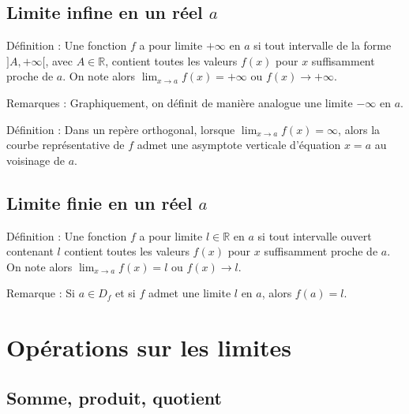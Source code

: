 \documentclass[11pt,a4paper]{article}
\begin{document}
\subsection{Limite infine en un réel $a$}

\begin{boiteDef}{Définition :}
    Une fonction $f$ a pour limite $+\infty$ en $a$ si tout intervalle de la forme $]A,+\infty[$, avec $A\in\mathbb{R}$, contient toutes les valeurs $f(x)$ pour $x$ suffisamment proche de $a$.
    \newline
    On note alors $\displaystyle \lim_{x \to a} f(x) = +\infty$ ou $f(x) \to +\infty$.
\end{boiteDef}

\begin{boiteRemarque}{Remarques :}
    Graphiquement, on définit de manière analogue une limite $-\infty$ en $a$.
\end{boiteRemarque}

\begin{boiteDef}{Définition :}
    Dans un repère orthogonal, lorsque $\displaystyle \lim_{x\to a} f(x) = \infty$, alors la courbe représentative de $f$ admet une asymptote verticale d'équation $x=a$ au voisinage de $a$.
\end{boiteDef}

\subsection{Limite finie en un réel $a$}

\begin{boiteDef}{Définition :}
    Une fonction $f$ a pour limite $l\in\mathbb{R}$ en $a$ si tout intervalle ouvert contenant $l$ contient toutes les valeurs $f(x)$ pour $x$ suffisamment proche de $a$.
    \newline
    On note alors $\displaystyle \lim_{x \to a} f(x) = l$ ou $f(x) \to l$.
\end{boiteDef}

\begin{boiteRemarque}{Remarque :}
    Si $a \in D_f$ et si $f$ admet une limite $l$ en $a$, alors $f(a) = l$.
\end{boiteRemarque}

\section{Opérations sur les limites}

\subsection{Somme, produit, quotient}
\end{document}
